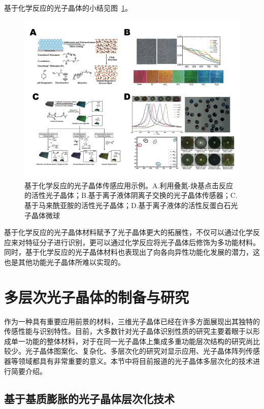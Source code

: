 基于化学反应的光子晶体的小结见图~\ref{fig:chem_react_phc}。
\begin{figure}[htbp]
	\centering
	\includegraphics[width=\linewidth]{figures/chem_react_phc.png}
	\caption{基于化学反应的光子晶体传感应用示例。A.利用叠氮-炔基点击反应的活性光子晶体\cite{Xu2012Clickable}；B.基于离子液体阴离子交换的光子晶体传感器\cite{Huang20103DOrdered}；C.基于马来酰亚胺的活性光子晶体\cite{Yang2013MaleimideContaining}；D.基于离子液体的活性反蛋白石光子晶体微球\cite{Cui2014Inverse}}
	\label{fig:chem_react_phc}
\end{figure}
基于化学反应的光子晶体材料赋予了光子晶体更大的拓展性，不仅可以通过化学反应来对特征分子进行识别，更可以通过化学反应将光子晶体后修饰为多功能材料。同时，基于化学反应的光子晶体材料也表现出了向各向异性功能化发展的潜力\cite{Cui2014Inverse}，这也是其他功能光子晶体所难以实现的。


\section{多层次光子晶体的制备与研究}
\label{sec:multiscale-phc}

作为一种具有重要应用前景的材料，三维光子晶体已经在许多方面展现出其独特的传感性能与识别特性。目前，大多数针对光子晶体识别性质的研究主要着眼于以形成单一功能的整体材料，对于在同一光子晶体上集成多重功能层次结构的研究尚比较少。光子晶体图案化、复杂化、多层次化的研究对显示应用、光子晶体阵列传感器等领域都具有非常重要的意义。本节中将目前报道的光子晶体多层次化的技术进行简要介绍。

\subsection{基于基质膨胀的光子晶体层次化技术}
\label{subsec:matrix-swell}

